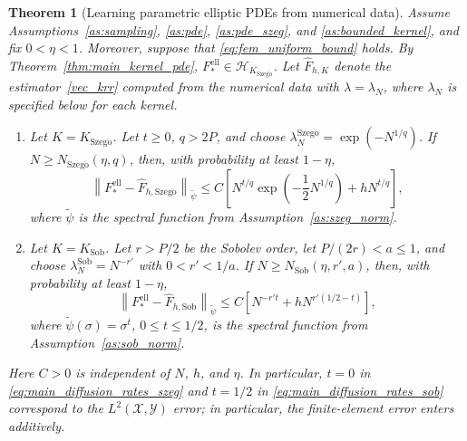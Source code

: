 \documentclass[11pt]{article}
\numberwithin{equation}{section}
\theoremstyle{plain}
\newtheorem{theorem}{Theorem}[section]
\theoremstyle{definition}
\theoremstyle{remark}
\newcommand{\X}{\mathcal{X}}
\newcommand{\Hs}{\mathcal{H}}
\newcommand{\Y}{\mathcal{Y}}
\newcommand{\tpsi}{\widetilde{\psi}}
\newcommand{\Fell}{F_{*}^{\mathrm{ell}}}
\begin{document}
\begin{theorem}[Learning parametric elliptic PDEs from numerical data]
\label{thm:main_diffusion_rates}
Assume Assumptions~\ref{as:sampling}, \ref{as:pde}, \ref{as:pde_szeg}, and \ref{as:bounded_kernel}, and fix $0<\eta<1$. Moreover, suppose that
\eqref{eq:fem_uniform_bound} holds. By Theorem~\ref{thm:main_kernel_pde},
$\Fell\in\Hs_{K_{\mathrm{Szeg\ddot{o}}}}$. Let $\hat F_{h,K}$ denote the
estimator~\eqref{vec_krr} computed from the numerical data with
$\lambda=\lambda_N$, where $\lambda_N$ is specified below for each kernel.

\begin{enumerate}[label=(\roman*)]

\item Let $K=K_{\mathrm{Szeg\ddot{o}}}$. Let
$t\geq0$, $q>2P$, and choose
$\lambda_N^{\mathrm{Szeg\ddot{o}}}=\exp(-N^{1/q})$.
If $N\geq N_{\mathrm{Szeg\ddot{o}}}(\eta,q)$,
then, with probability at least $1-\eta$,
\begin{equation}
\left\|\Fell-\hat{F}_{h,\mathrm{Szeg\ddot{o}}}\right\|_{\tpsi}
\leq
C\left[
N^{t/q}\exp\left(-\frac12N^{1/q}\right)
+
hN^{t/q}
\right],
\label{eq:main_diffusion_rates_szeg}
\end{equation}
where $\tpsi$ is the spectral function from
Assumption~\ref{as:szeg_norm}.

\item Let $K=K_{\mathrm{Sob}}$. Let \(r>P/2\) be the Sobolev order,
let \(P/(2r)<a\leq1\), and choose
$\lambda_N^{\mathrm{Sob}}=N^{-r'}$ with $0<r'<1/a$.
If $N\geq N_{\mathrm{Sob}}(\eta,r',a)$, then, with probability at least
$1-\eta$,
\begin{equation}
\left\|\Fell-\hat{F}_{h,\mathrm{Sob}}\right\|_{\tpsi}
\leq
C\left[
N^{-r't}
+
hN^{r'(1/2-t)}
\right],
\label{eq:main_diffusion_rates_sob}
\end{equation}
where $\tpsi(\sigma)=\sigma^t$, \(0\leq t\leq1/2\), is the spectral
function from Assumption~\ref{as:sob_norm}.

\end{enumerate}

Here $C>0$ is independent of $N$, $h$, and $\eta$. In particular, \(t=0\) in
\eqref{eq:main_diffusion_rates_szeg} and \(t=1/2\) in
\eqref{eq:main_diffusion_rates_sob} correspond to the
$L^2(\X,\Y)$ error; in particular, the finite-element error enters
additively.

\end{theorem}
\end{document}

